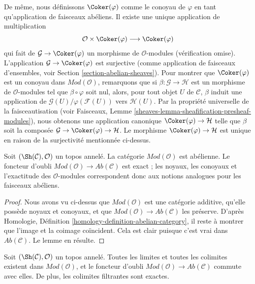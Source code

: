 \medskip\noindent
De même, nous définissons $\Coker(\varphi)$ comme le conoyau de $\varphi$ en
tant qu'application de faisceaux abéliens. Il existe une unique application de
multiplication
$$
\mathcal{O} \times \Coker(\varphi) \longrightarrow \Coker(\varphi)
$$
qui fait de $\mathcal{G} \to \Coker(\varphi)$ un morphisme de
$\mathcal{O}$-modules (vérification omise). L'application
$\mathcal{G} \to \Coker(\varphi)$ est surjective (comme application de
faisceaux d'ensembles, voir Section \ref{section-abelian-sheaves}). Pour montrer
que $\Coker(\varphi)$ est un conoyau dans $\textit{Mod}(\mathcal{O})$,
remarquons que si $\beta : \mathcal{G} \to \mathcal{H}$ est un morphisme de
$\mathcal{O}$-modules tel que $\beta \circ \varphi$ soit nul, alors, pour tout
objet $U$ de $\mathcal{C}$, $\beta$ induit une application de
$\mathcal{G}(U)/\varphi(\mathcal{F}(U))$ vers $\mathcal{H}(U)$. Par la
propriété universelle de la faisceautisation (voir Faisceaux, Lemme
\ref{sheaves-lemma-sheafification-presheaf-modules}), nous obtenons une
application canonique $\Coker(\varphi) \to \mathcal{H}$ telle que $\beta$ soit
la composée $\mathcal{G} \to \Coker(\varphi) \to \mathcal{H}$. Le morphisme
$\Coker(\varphi) \to \mathcal{H}$ est unique en raison de la surjectivité
mentionnée ci-dessus.

\begin{lemma}
\label{lemma-abelian}
Soit $(\Sh(\mathcal{C}), \mathcal{O})$ un topos annelé. La catégorie
$\textit{Mod}(\mathcal{O})$ est abélienne. Le foncteur d'oubli
$\textit{Mod}(\mathcal{O}) \to \textit{Ab}(\mathcal{C})$
est exact ; les noyaux, les conoyaux et l'exactitude des
$\mathcal{O}$-modules correspondent donc aux notions analogues pour les
faisceaux abéliens.
\end{lemma}

\begin{proof}
Nous avons vu ci-dessus que $\textit{Mod}(\mathcal{O})$ est une catégorie
additive, qu'elle possède noyaux et conoyaux, et que
$\textit{Mod}(\mathcal{O}) \to \textit{Ab}(\mathcal{C})$ les préserve. D'après
Homologie, Définition \ref{homology-definition-abelian-category}, il reste à
montrer que l'image et la coimage coïncident. Cela est clair puisque c'est vrai
dans $\textit{Ab}(\mathcal{C})$. Le lemme en résulte.
\end{proof}

\begin{lemma}
\label{lemma-limits-colimits}
Soit $(\Sh(\mathcal{C}), \mathcal{O})$ un topos annelé. Toutes les limites et
toutes les colimites existent dans $\textit{Mod}(\mathcal{O})$, et le foncteur
d'oubli
$\textit{Mod}(\mathcal{O}) \to \textit{Ab}(\mathcal{C})$
commute avec elles. De plus, les colimites filtrantes sont exactes.
\end{lemma}

